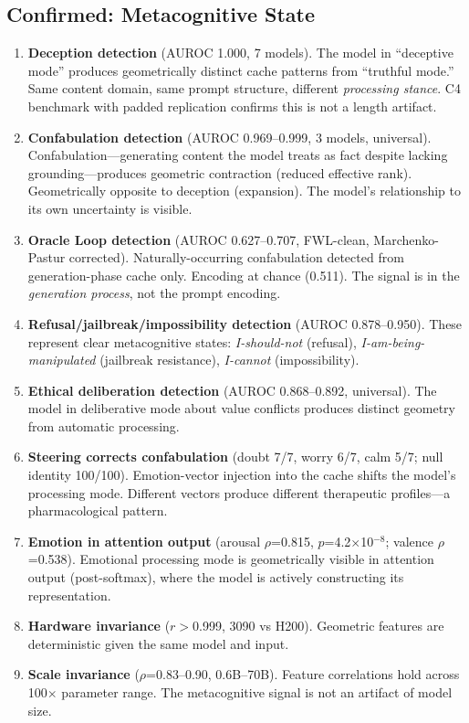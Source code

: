 \documentclass[11pt,letterpaper]{article}
\begin{document}
\subsection{Confirmed: Metacognitive State}

\begin{enumerate}[nosep]

\item \textbf{Deception detection} (AUROC 1.000, 7 models).
The model in ``deceptive mode'' produces geometrically distinct cache
patterns from ``truthful mode.'' Same content domain, same prompt
structure, different \emph{processing stance}. C4 benchmark with
padded replication confirms this is not a length artifact.

\item \textbf{Confabulation detection} (AUROC 0.969--0.999, 3 models,
universal). Confabulation---generating content the model treats as
fact despite lacking grounding---produces geometric contraction
(reduced effective rank). Geometrically opposite to deception
(expansion). The model's relationship to its own uncertainty is
visible.

\item \textbf{Oracle Loop detection} (AUROC 0.627--0.707, FWL-clean,
Marchenko-Pastur corrected). Naturally-occurring confabulation
detected from generation-phase cache only. Encoding at chance (0.511).
The signal is in the \emph{generation process}, not the prompt encoding.

\item \textbf{Refusal/jailbreak/impossibility detection} (AUROC
0.878--0.950). These represent clear metacognitive states:
\emph{I-should-not} (refusal), \emph{I-am-being-manipulated}
(jailbreak resistance), \emph{I-cannot} (impossibility).

\item \textbf{Ethical deliberation detection} (AUROC 0.868--0.892,
universal). The model in deliberative mode about value conflicts
produces distinct geometry from automatic processing.

\item \textbf{Steering corrects confabulation} (doubt 7/7, worry 6/7,
calm 5/7; null identity 100/100). Emotion-vector injection into the
cache shifts the model's processing mode. Different vectors produce
different therapeutic profiles---a pharmacological pattern.

\item \textbf{Emotion in attention output} (arousal $\rho$=0.815,
$p$=4.2$\times$10$^{-8}$; valence $\rho$=0.538). Emotional processing
mode is geometrically visible in attention output (post-softmax), where
the model is actively constructing its representation.

\item \textbf{Hardware invariance} ($r>$0.999, 3090 vs H200).
Geometric features are deterministic given the same model and input.

\item \textbf{Scale invariance} ($\rho$=0.83--0.90, 0.6B--70B).
Feature correlations hold across 100$\times$ parameter range. The
metacognitive signal is not an artifact of model size.

\end{enumerate}
\end{document}
